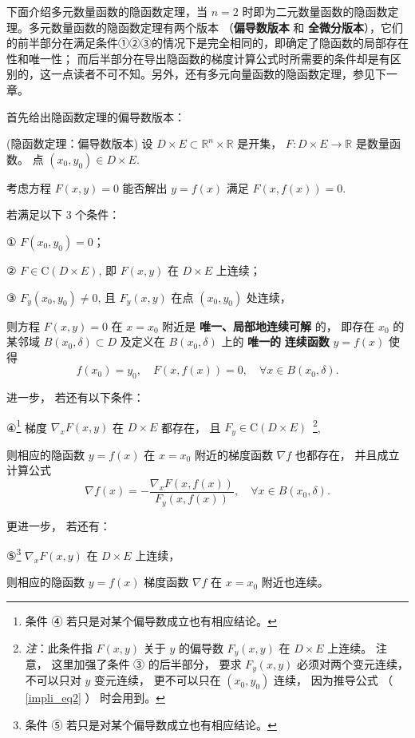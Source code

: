 下面介绍多元数量函数的隐函数定理，当 $n=2$ 时即为二元数量函数的隐函数定理。多元数量函数的隐函数定理有两个版本 （\textbf{偏导数版本} 和\textbf{ 全微分版本}），它们的前半部分在满足条件①②③的情况下是完全相同的，即确定了隐函数的局部存在性和唯一性； 而后半部分在导出隐函数的梯度计算公式时所需要的条件却是有区别的，这一点读者不可不知。另外，还有多元向量函数的隐函数定理，参见下一章。

首先给出隐函数定理的偏导数版本：

 \begin{theorem}{(隐函数定理：偏导数版本)}\label{impli_the2}
 设 $D\times E\subset\mathbb{R}^{n}\times\mathbb{R}$ 是开集， $F:D\times E\rightarrow\mathbb{R}$
是数量函数。 点 $(x_{0},y_{0})\in D\times E.$ 

考虑方程 $F(x,y)=0$ 能否解出 $y=f(x)$ 满足 $F(x,f(x))=0.$ 

若满足以下 3 个条件：

① $F(x_{0},y_{0})=0$；

② $F\in\mathrm{C}(D\times E)$, 即 $F(x,y)$ 在 $D\times E$ 上连续； 

③ $F_{y}(x_{0},y_{0})\neq0$, 且 $F_{y}(x,y)$ 在点 $(x_0,y_0)$ 处连续，

则方程 $F(x,y)=0$ 在 $x=x_{0}$ 附近是\textbf{ 唯一、局部地连续可解} 的， 即存在 $x_{0}$
的某邻域 $B(x_{0},\delta)\subset D$ 及定义在 $B(x_{0},\delta)$ 上的 \textbf{唯一的} \textbf{
连续函数} $y=f(x)$ 使得
\[
f(x_{0})=y_{0},\quad F(x,f(x))=0,\quad\forall x\in B(x_{0},\delta).
\]

进一步， 若还有以下条件：

④\footnote{条件 ④ 若只是对某个偏导数成立也有相应结论。 } 梯度 $\nabla_{x}F(x,y)$ 在 $D\times E$
都存在， 且 $F_y\in\mathrm{C}(D\times E)$ $\,$\footnote{\textsl{注}：此条件指 $F(x,y)$ 关于 $y$ 的偏导数 $F_{y}(x,y)$
 在 $D\times E$ 上连续。 注意， 这里加强了条件 ③ 的后半部分， 要求 $F_{y}(x,y)$ 必须对两个变元连续， 不可以只对 $y$
 变元连续， 更不可以只在 $(x_0,y_0)$ 连续， 因为推导公式 （ \autoref{impli_eq2} ） 时会用到。},

则相应的隐函数 $y=f(x)$ 在 $x=x_{0}$ 附近的梯度函数 $\nabla f$ 也都存在， 并且成立计算公式
\[
\nabla f(x)=-{\displaystyle \frac{\nabla_{x}F(x,f(x))}{F_{y}(x,f(x))}},\quad\forall x\in B(x_{0},\delta).
\]

更进一步， 若还有：

⑤\footnote{条件 ⑤ 若只是对某个偏导数成立也有相应结论。} $\nabla_{x}F(x,y)$ 在 $D\times E$
上连续， 

则相应的隐函数 $y=f(x)$ 梯度函数 $\nabla f$ 在 $x=x_{0}$ 附近也连续。


\end{theorem}
